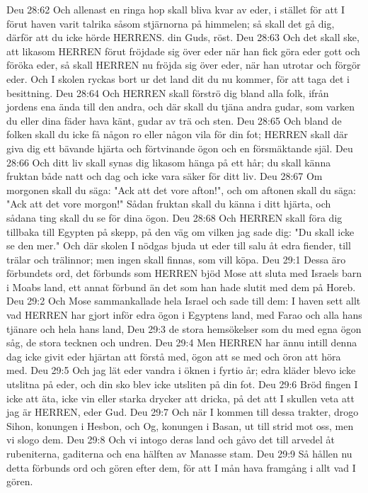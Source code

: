 Deu 28:62  Och allenast en ringa hop skall bliva kvar av eder, i stället för att I förut haven varit talrika såsom stjärnorna på himmelen; så skall det gå dig, därför att du icke hörde HERRENS. din Guds, röst.
Deu 28:63  Och det skall ske, att likasom HERREN förut fröjdade sig över eder när han fick göra eder gott och föröka eder, så skall HERREN nu fröjda sig över eder, när han utrotar och förgör eder. Och I skolen ryckas bort ur det land dit du nu kommer, för att taga det i besittning.
Deu 28:64  Och HERREN skall förströ dig bland alla folk, ifrån jordens ena ända till den andra, och där skall du tjäna andra gudar, som varken du eller dina fäder hava känt, gudar av trä och sten.
Deu 28:65  Och bland de folken skall du icke få någon ro eller någon vila för din fot; HERREN skall där giva dig ett bävande hjärta och förtvinande ögon och en försmäktande själ.
Deu 28:66  Och ditt liv skall synas dig likasom hänga på ett hår; du skall känna fruktan både natt och dag och icke vara säker för ditt liv.
Deu 28:67  Om morgonen skall du säga: "Ack att det vore afton!", och om aftonen skall du säga: "Ack att det vore morgon!" Sådan fruktan skall du känna i ditt hjärta, och sådana ting skall du se för dina ögon.
Deu 28:68  Och HERREN skall föra dig tillbaka till Egypten på skepp, på den väg om vilken jag sade dig: "Du skall icke se den mer." Och där skolen I nödgas bjuda ut eder till salu åt edra fiender, till trälar och trälinnor; men ingen skall finnas, som vill köpa.
Deu 29:1  Dessa äro förbundets ord, det förbunds som HERREN bjöd Mose att sluta med Israels barn i Moabs land, ett annat förbund än det som han hade slutit med dem på Horeb.
Deu 29:2  Och Mose sammankallade hela Israel och sade till dem: I haven sett allt vad HERREN har gjort inför edra ögon i Egyptens land, med Farao och alla hans tjänare och hela hans land,
Deu 29:3  de stora hemsökelser som du med egna ögon såg, de stora tecknen och undren.
Deu 29:4  Men HERREN har ännu intill denna dag icke givit eder hjärtan att förstå med, ögon att se med och öron att höra med.
Deu 29:5  Och jag lät eder vandra i öknen i fyrtio år; edra kläder blevo icke utslitna på eder, och din sko blev icke utsliten på din fot.
Deu 29:6  Bröd fingen I icke att äta, icke vin eller starka drycker att dricka, på det att I skullen veta att jag är HERREN, eder Gud.
Deu 29:7  Och när I kommen till dessa trakter, drogo Sihon, konungen i Hesbon, och Og, konungen i Basan, ut till strid mot oss, men vi slogo dem.
Deu 29:8  Och vi intogo deras land och gåvo det till arvedel åt rubeniterna, gaditerna och ena hälften av Manasse stam.
Deu 29:9  Så hållen nu detta förbunds ord och gören efter dem, för att I mån hava framgång i allt vad I gören.
